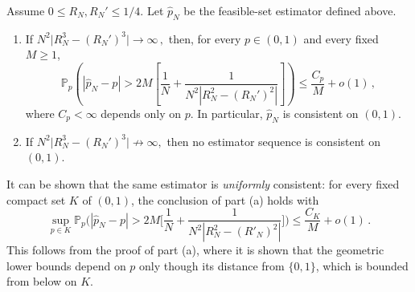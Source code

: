 \documentclass[ECP,preprint]{ejpecp} %
\newcommand{\1}{\mathbf 1}
\newcommand{\PP}{\mathbb P}
\begin{document}
\begin{theorem} \label{thm:main-result}
Assume \(0 \le R_N,R_N' \le 1/4\). Let \(\widehat p_N\) be the feasible-set estimator defined above.
%
\begin{enumerate}[label=\textup{(\alph*)}]
    \item If
    \(
        N^2\big|R_N^3-(R_N')^3\big|\to\infty \, ,
    \)
    then, for every \(p \in (0,1) \) and every fixed \(M\ge1\),
    \[
        \PP_p\left(
        |\widehat p_N-p|
        >
        2M\left[
            \frac1N+
            \frac{1}{N^2|R_N^2-(R_N')^2|}
        \right]
        \right)
        \le
        \frac{C_p}{M}+o(1) \, ,
    \]
    where \(C_p < \infty\) depends only on \(p\). In particular, \(\widehat p_N\) is consistent on \( (0,1) \). 
    \item If
    \(
        N^2\big|R_N^3-(R_N')^3\big|\not\to\infty,
    \)
    then no estimator sequence is consistent on \( (0,1) \).
\end{enumerate}
\end{theorem}


\begin{remark}
    It can be shown that the same estimator is \emph{uniformly} consistent: for every fixed compact set $K$ of $(0,1)$, the conclusion of part (a) holds with
    \[
        \sup_{p \in K} \PP_p \Big( |\widehat p_N - p | > 2M \Big[ \frac1N + \frac{1}{N^2 |R_N^2 - (R'_N)^2 | }\Big] \Big) \leq \frac{C_K}{M} + o(1) \, .
    \]
    This follows from the proof of part (a), where it is shown that the geometric lower bounds depend on $p$ only though its distance from $\{0,1\}$, which is bounded from below on $K$.
\end{remark}    
\end{document}
